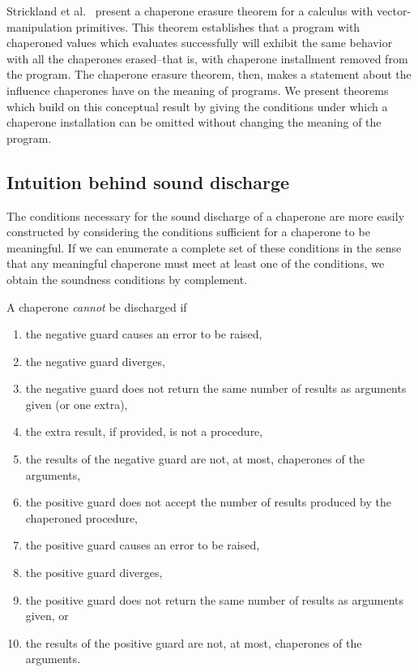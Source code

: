 \documentclass{sigplanconf}
\begin{document}
Strickland et al.~\cite{strickland2012chaperones} present a chaperone erasure theorem for a calculus with vector-manipulation primitives.
This theorem establishes that a program with chaperoned values which evaluates successfully will exhibit the same behavior with all the chaperones erased--that is, with chaperone installment removed from the program.
The chaperone erasure theorem, then, makes a statement about the influence chaperones have on the meaning of programs.
We present theorems which build on this conceptual result by giving the conditions under which a chaperone installation can be omitted without changing the meaning of the program.

\subsection{Intuition behind sound discharge}

The conditions necessary for the sound discharge of a chaperone are more easily constructed by considering the conditions sufficient for a chaperone to be meaningful.
If we can enumerate a complete set of these conditions in the sense that any meaningful chaperone must meet at least one of the conditions, we obtain the soundness conditions by complement.

A chaperone \emph{cannot} be discharged if
\begin{enumerate}
\item the negative guard causes an error to be raised,
\item the negative guard diverges,
\item the negative guard does not return the same number of results as arguments given (or one extra),
\item the extra result, if provided, is not a procedure,
\item the results of the negative guard are not, at most, chaperones of the arguments,
\item the positive guard does not accept the number of results produced by the chaperoned procedure,
\item the positive guard causes an error to be raised,
\item the positive guard diverges,
\item the positive guard does not return the same number of results as arguments given, or
\item the results of the positive guard are not, at most, chaperones of the arguments.
\end{enumerate}
\end{document}
